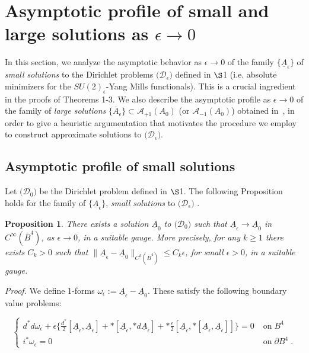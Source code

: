 \documentclass[11pt]{article}
\numberwithin{equation}{section} \setlength{\topmargin}{-35pt}
\begin{document}
\section{Asymptotic profile of small and large solutions as $\epsilon\to 0$}
In this section, we analyze the asymptotic behavior as $\epsilon\to
0$ of the family $\{\underline{A}_{\epsilon}\}$ of \emph{small
solutions} to the Dirichlet problems $\bigl(\mathcal{D}_\epsilon
\bigr)$ defined in $\S$1 (i.e. absolute minimizers for the
$SU(2)_\epsilon$-Yang Mills functionals).
 This is a crucial ingredient in the proofs of
Theorems 1-3. We also describe the asymptotic profile as
$\epsilon\to 0$ of the family of \emph{large solutions}
$\{\overline{A}_{\epsilon}\}\subset\mathcal{A}_{+1}(A_0)$ (or
$\mathcal{A}_{-1}(A_0)$) obtained in~\cite{IM}, in order to give a
heuristic argumentation that motivates the procedure we employ to
construct approximate solutions to
$\bigl(\mathcal{D}_{\epsilon}\bigr)$.

\subsection{Asymptotic profile of small solutions}
Let $\bigl(\mathcal{D}_0\bigr)$ be the  Dirichlet problem defined in
$\S$1. The following Proposition holds for the family of
$\{\underline{A}_{\epsilon}\}$, \emph{small solutions} to
$\bigl(\mathcal{D}_\epsilon\bigr)$  .
\newtheorem{proposition}{Proposition}[section]
\begin{proposition}
\label{P2.1} There exists a solution $\underline{A}_0$ to
$\bigl(\mathcal{D}_0\bigr)$ such that
$\underline{A}_{\epsilon}\to\underline{A}_0$ in
$C^{\infty}(\overline{B}^4)$, as $\epsilon\to 0$, in a suitable
gauge. More precisely, for any $k\ge 1$ there exists $C_k>0$ such
that
$\|\underline{A}_{\epsilon}-\underline{A}_0\|_{C^k(\overline{B}^4)}\le
C_k\epsilon$, for small $\epsilon>0$, in a suitable gauge.
\end{proposition}

\textit{Proof.} We define 1-forms $\omega_\epsilon :=
 {\underline  A}_\epsilon - {\underline A}_0.$ These satisfy the following
boundary value
 problems:

\begin{equation}
\label{omega} \left \{
\begin{array}{ll}
d^*d \omega_\epsilon +\epsilon\{ \frac{d^*}{2}[{\underline
A}_\epsilon, {\underline  A}_\epsilon]+* [{\underline  A}_\epsilon,
*d {\underline  A}_\epsilon] +*\frac {\epsilon}
{2}[{\underline  A}_\epsilon,* [{\underline  A}_\epsilon,
{\underline  A}_\epsilon]]\}  =0 & \;\text{on$\;B^4$}\\
i^*\omega_\epsilon= 0& \;\text{on$\;\partial B^4\;.$}
\end{array}
\right .
\end{equation}
\end{document}
